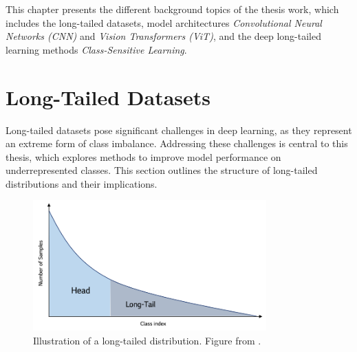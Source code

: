 
This chapter presents the different background topics of the thesis work, which includes the long-tailed datasets, model architectures \textit{Convolutional Neural Networks (CNN)} and \textit{Vision Transformers (ViT)}, and the deep long-tailed learning methods \textit{Class-Sensitive Learning}.


\section{Long-Tailed Datasets}
\label{sec:lt-datasets}
Long-tailed datasets pose significant challenges in deep learning, as they represent an extreme form of class imbalance. Addressing these challenges is central to this thesis, which explores methods to improve model performance on underrepresented classes. This section outlines the structure of long-tailed distributions and their implications.

\begin{figure}[ht]
    \centering
    \includegraphics[width=0.8\textwidth]{Images/long_tail_distribution.png} 
    \caption{Illustration of a long-tailed distribution. Figure from \cite{lgresearch257}.}
    \label{fig:lt_distribution} %
\end{figure}

